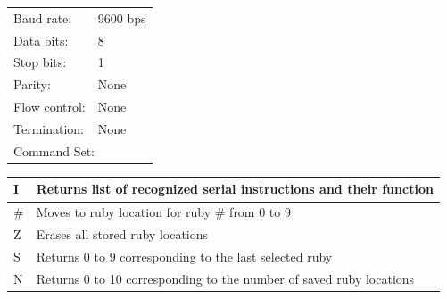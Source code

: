 \begin{table}[!htbp]
	\centering
	
	\vspace{0.5em}
	

	\begin{minipage}{\textwidth}
		\linespread{1.2}
		\selectfont
		
		\begin{tabular} {| l | l |} 
			\hline
			Baud rate: & 9600 bps \\
			Data bits: & 8 \\
			Stop bits: & 1 \\
			Parity: & None \\
			Flow control: & None \\
			Termination: & None\\
			\hline
			\multicolumn{2}{|l|}{Command Set:}\\
			\hline
			
		\end{tabular}
		
		\begin{tabular}{| l | l |}
			\hline
			I & 
			\begin{minipage}{.85\textwidth} \vspace{1mm} Returns list of recognized serial instructions and their function
			\end{minipage}	\\			
			\hline
			\# &
			\begin{minipage}{.85\textwidth} \vspace{1mm} Moves to ruby location for ruby \# from 0 to 9
			\end{minipage}\\
			\hline	
			Z &
			\begin{minipage}{.85\textwidth} \vspace{1mm} Erases all stored ruby locations
			\end{minipage}\\
			\hline	
			S &
			\begin{minipage}{.85\textwidth} \vspace{1mm} Returns 0 to 9 corresponding to the last selected ruby
			\end{minipage}\\
			\hline
			N &
			\begin{minipage}{.85\textwidth} \vspace{1mm} Returns 0 to 10 corresponding to the number of saved ruby locations
			\end{minipage}\\
			\hline	
			
		\end{tabular}
		
	\end{minipage}
	
	\label{table:rs232TGP}
\end{table}

